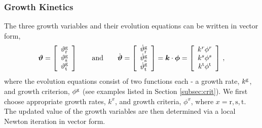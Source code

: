 \documentclass[10pt,letterpaper,oneside]{report}
\newcommand{\ten}[1]{\mbox{\boldmath $#1$}{}}
\newcommand{\scas}[1]{\mbox{{\scriptsize{${\rm{#1}}$}}}{}}
\begin{document}
\begin{itemize}
\subsubsection{Growth Kinetics}
The three growth variables and their evolution equations can be written in vector form, 
\begin{equation}
\ten{\vartheta} = \left[ \begin{array}{c} \vartheta^{\scas{g}}_{\scas{r}} \\ \vartheta^{\scas{g}}_{\scas{s}} \\ \vartheta^{\scas{g}}_{\scas{t}} \end{array} \right] 
\qquad \mbox{and} \qquad
\dot{\ten{\vartheta} } = \left[ \begin{array}{c} \dot{\vartheta}^{\scas{g}}_{\scas{r}} \\ \dot{\vartheta}^{\scas{g}}_{\scas{s}} \\ \dot{\vartheta}^{\scas{g}}_{\scas{t}} \end{array} \right]  = \ten{k} \cdot \ten{\phi} = \left[ \begin{array}{c} k^{r} \phi^{r} \\ k^{s} \phi^{s} \\ k^{\scas{t}} \phi^{\scas{t}} \end{array} \right] \, ,
\end{equation}
where the evolution equations consist of two functions each - a growth rate, $k^{\scas{g}}$, and growth criterion, $\phi^{\scas{g}}$ (see examples listed in Section \ref{subsec:crit}).  We first choose appropriate growth rates, $k^x$, and growth criteria, $\phi^x$, where $x = \mbox{r},\mbox{s},\mbox{t}$.  The updated value of the growth variables are then determined via a local Newton iteration in vector form. 


\end{itemize}
\end{document}

